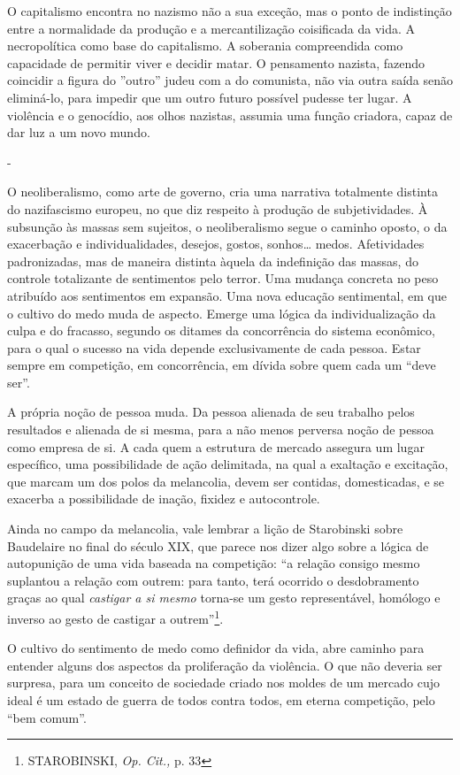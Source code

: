 O capitalismo encontra no nazismo não a sua exceção, mas o ponto de
indistinção entre a normalidade da produção e a mercantilização
coisificada da vida. A necropolítica como base do capitalismo. A
soberania compreendida como capacidade de permitir viver e decidir
matar. O pensamento nazista, fazendo coincidir a figura do ''outro''
judeu com a do comunista, não via outra saída senão eliminá-lo, para
impedir que um outro futuro possível pudesse ter lugar. A violência e o
genocídio, aos olhos nazistas, assumia uma função criadora, capaz de dar
luz a um novo mundo.

-

O neoliberalismo, como arte de governo, cria uma narrativa totalmente
distinta do nazifascismo europeu, no que diz respeito à produção de
subjetividades. À subsunção às massas sem sujeitos, o neoliberalismo
segue o caminho oposto, o da exacerbação e individualidades, desejos,
gostos, sonhos\ldots{} medos. Afetividades padronizadas, mas de maneira
distinta àquela da indefinição das massas, do controle totalizante de
sentimentos pelo terror. Uma mudança concreta no peso atribuído aos
sentimentos em expansão. Uma nova educação sentimental, em que o cultivo
do medo muda de aspecto. Emerge uma lógica da individualização da culpa
e do fracasso, segundo os ditames da concorrência do sistema econômico,
para o qual o sucesso na vida depende exclusivamente de cada pessoa.
Estar sempre em competição, em concorrência, em dívida sobre quem cada
um ``deve ser''.

A própria noção de pessoa muda. Da pessoa alienada de seu trabalho pelos
resultados e alienada de si mesma, para a não menos perversa noção de
pessoa como empresa de si. A cada quem a estrutura de mercado assegura
um lugar específico, uma possibilidade de ação delimitada, na qual a
exaltação e excitação, que marcam um dos polos da melancolia, devem ser
contidas, domesticadas, e se exacerba a possibilidade de inação, fixidez
e autocontrole.

Ainda no campo da melancolia, vale lembrar a lição de Starobinski sobre
Baudelaire no final do século XIX, que parece nos dizer algo sobre a
lógica de autopunição de uma vida baseada na competição: ``a relação
consigo mesmo suplantou a relação com outrem: para tanto, terá ocorrido
o desdobramento graças ao qual \emph{castigar a si mesmo} torna-se um
gesto representável, homólogo e inverso ao gesto de castigar a
outrem''\footnote{STAROBINSKI, \emph{Op. Cit.,} p. 33}.

O cultivo do sentimento de medo como definidor da vida, abre caminho
para entender alguns dos aspectos da proliferação da violência. O que
não deveria ser surpresa, para um conceito de sociedade criado nos
moldes de um mercado cujo ideal é um estado de guerra de todos contra
todos, em eterna competição, pelo ``bem comum''.

